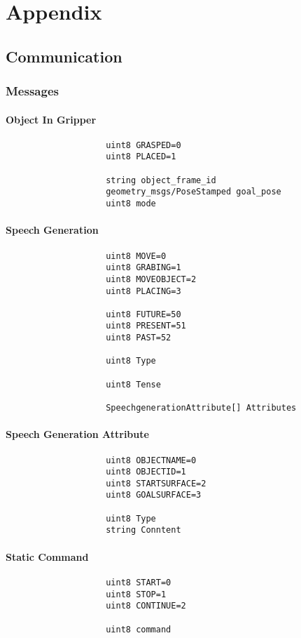 \documentclass[main.tex]{subfiles}
\begin{document}
\begingroup

\renewcommand{\cleardoublepage}{}

\renewcommand{\clearpage}{}

	\chapter{Appendix}
		\section{Communication}
			\subsection{Messages}
			\label{msgs}
				\subsubsection{Object In Gripper}
					\begin{lstlisting}
					uint8 GRASPED=0
					uint8 PLACED=1
		
					string object_frame_id
					geometry_msgs/PoseStamped goal_pose
					uint8 mode
					\end{lstlisting}
				\subsubsection{Speech Generation}
					\begin{lstlisting}
					uint8 MOVE=0
					uint8 GRABING=1
					uint8 MOVEOBJECT=2
					uint8 PLACING=3
		
					uint8 FUTURE=50
					uint8 PRESENT=51
					uint8 PAST=52
		
					uint8 Type
		
					uint8 Tense
		
					SpeechgenerationAttribute[] Attributes
					\end{lstlisting}
				\subsubsection{Speech Generation Attribute}
					\begin{lstlisting}
					uint8 OBJECTNAME=0
					uint8 OBJECTID=1
					uint8 STARTSURFACE=2
					uint8 GOALSURFACE=3
					
					uint8 Type
					string Conntent
					\end{lstlisting}
				\subsubsection{Static Command}
					\begin{lstlisting}
					uint8 START=0
					uint8 STOP=1
					uint8 CONTINUE=2
		
					uint8 command
					\end{lstlisting}
\end{document}
